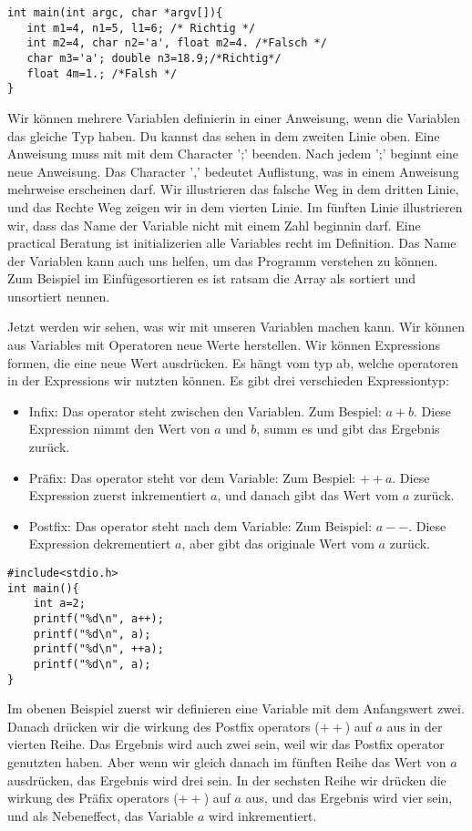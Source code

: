 \begin{lstlisting}
int main(int argc, char *argv[]){
   int m1=4, n1=5, l1=6; /* Richtig */
   int m2=4, char n2='a', float m2=4. /*Falsch */
   char m3='a'; double n3=18.9;/*Richtig*/
   float 4m=1.; /*Falsh */
}
\end{lstlisting} 

Wir können mehrere Variablen definierin in einer Anweisung, wenn die Variablen das gleiche Typ haben. Du kannst das sehen in dem zweiten Linie oben.
Eine Anweisung muss mit mit dem Character ';' beenden. Nach jedem ';' beginnt eine neue Anweisung. Das Character ',' bedeutet Auflistung, was in 
einem Anweisung mehrweise erscheinen darf. Wir illustrieren das falsche Weg in  dem dritten Linie, und das Rechte Weg zeigen wir in dem vierten Linie.
Im fünften Linie illustrieren wir, dass das Name der Variable nicht mit einem Zahl beginnin darf. Eine practical Beratung ist initializerien
alle Variables recht im Definition. Das Name der Variablen kann auch uns helfen, um das Programm verstehen zu können. Zum Beispiel im 
Einfügesortieren es ist ratsam die Array als sortiert und unsortiert nennen.

Jetzt werden wir sehen, was wir mit unseren Variablen machen kann. Wir können aus Variables mit Operatoren neue Werte herstellen.
Wir können Expressions formen, die eine neue Wert ausdrücken. Es hängt vom typ ab, welche operatoren in der Expressions wir nutzten können.
Es gibt drei verschieden Expressiontyp:
\begin{itemize}
\item Infix: Das operator steht zwischen den Variablen. Zum Bespiel: $a+b$. Diese Expression nimmt den Wert von $a$ und $b$, summ es und gibt das Ergebnis zurück.
\item Präfix: Das operator steht vor dem Variable: Zum Bespiel: $++a$. Diese Expression zuerst inkrementiert $a$, und danach gibt das Wert vom $a$ zurück.
\item Postfix: Das operator steht nach dem Variable: Zum Beispiel: $a--$. Diese Expression dekrementiert $a$, aber gibt das originale Wert vom $a$ zurück.
\end{itemize}
\begin{lstlisting}
#include<stdio.h>
int main(){
    int a=2;
    printf("%d\n", a++);
    printf("%d\n", a);
    printf("%d\n", ++a);
    printf("%d\n", a);
}
\end{lstlisting}
Im obenen Beispiel zuerst wir definieren eine Variable mit dem Anfangswert zwei. Danach drücken wir die wirkung des Postfix operators ($++$) auf $a$ aus 
in der vierten Reihe. Das Ergebnis wird auch zwei sein, weil wir das Postfix operator genutzten haben. Aber wenn wir gleich danach im fünften Reihe
das Wert von $a$ ausdrücken, das Ergebnis wird drei sein. In der sechsten Reihe wir drücken die wirkung des Präfix operators ($++$) auf $a$ aus, und 
das Ergebnis wird vier sein, und als Nebeneffect, das Variable $a$ wird inkrementiert.

